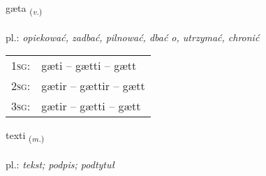 \documentclass[frontgrid, backgrid]{flacards}\usepackage[]{graphicx}\usepackage[]{xcolor}
\begin{document}
\renewcommand{\blhead}{\vskip5pt {\small\bfseries\footnotesize Sagnorð | Verb }}
\renewcommand{\bcfoot}{\vskip5pt \hspace{2pt}{\small\bfseries\footnotesize 1K}}


{gæta \small{\textsubscript{(\textit{v.})}} \\[1ex] %
\textphonetic{[caiːta]} \\
pl.: \emph{opiekować, zadbać, pilnować, dbać o, utrzymać, chronić} \\  [2ex]
\renewcommand*{\arraystretch}{0.8}
\begin{tabular}{p{1cm}l}
\textsc{1sg}: & gæti -- gætti -- gætt \\ 
\textsc{2sg}: & gætir -- gættir -- gætt \\ 
\textsc{3sg}: & gætir -- gætti -- gætt \\ 
\end{tabular}
}

\renewcommand{\flhead}{\vskip5pt \fboxsep=0pt {\small\bfseries\footnotesize Nafnorð | Noun}}
\renewcommand{\fcfoot}{\vskip5pt \fboxsep=0pt \hspace{2pt}{\small\bfseries\footnotesize 1K}}

\renewcommand{\blhead}{\vskip5pt {\small\bfseries\footnotesize Nafnorð | Noun }}
\renewcommand{\bcfoot}{\vskip5pt \hspace{2pt}{\small\bfseries\footnotesize 1K}}


{texti \small{\textsubscript{(\textit{m.})}} \\[1ex] %
\textphonetic{[tʰɛkstɪ]} \\
pl.: \emph{tekst; podpis; podtytuł} \\  [2ex]
\renewcommand*{\arraystretch}{0.8}
}
\end{document}
